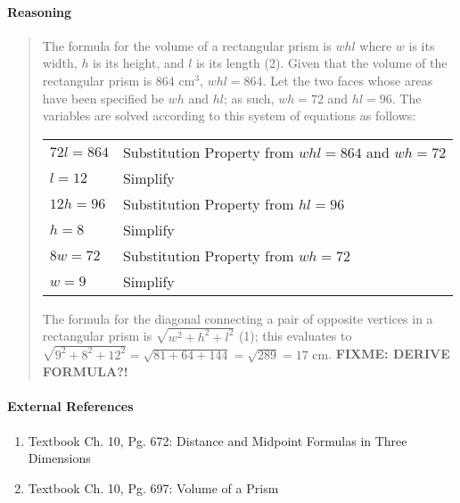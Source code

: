 \documentclass[letterpaper,12pt,twoside]{report}
\begin{document}
	\paragraph{Reasoning}
	\begin{quotation}
		
		The formula for the volume of a rectangular prism is $whl$ where $w$ is its width, $h$ is its height, and $l$ is its length (2). Given that the volume of the rectangular prism is 864 $\text{cm}^3$, $whl=864$. Let the two faces whose areas have been specified be $wh$ and $hl$; as such, $wh=72$ and $hl=96$. The variables are solved according to this system of equations as follows:
		
		\begin{center}
			\begin{tabular}{l | l}
				$72l=864$ & Substitution Property from $whl=864$ and $wh=72$ \\
				$l=12$ & Simplify \\
				\hline
				$12h=96$ & Substitution Property from $hl=96$ \\
				$h=8$ & Simplify \\
				\hline
				$8w=72$ & Substitution Property from $wh=72$ \\
				$w=9$ & Simplify
			\end{tabular}
		\end{center}
		
		The formula for the diagonal connecting a pair of opposite vertices in a rectangular prism is $\sqrt{w^2+h^2+l^2}$ (1); this evaluates to $\sqrt{9^2+8^2+12^2}=\sqrt{81+64+144}=\sqrt{289}=\boxed{17 \text{ cm}}$. \textbf{FIXME: DERIVE FORMULA?!}
	\end{quotation}
	
	\paragraph{External References}
	
	\begin{enumerate}
		\item Textbook Ch. 10, Pg. 672: Distance and Midpoint Formulas in Three Dimensions
		\item Textbook Ch. 10, Pg. 697: Volume of a Prism
	\end{enumerate}
	
\end{document}
